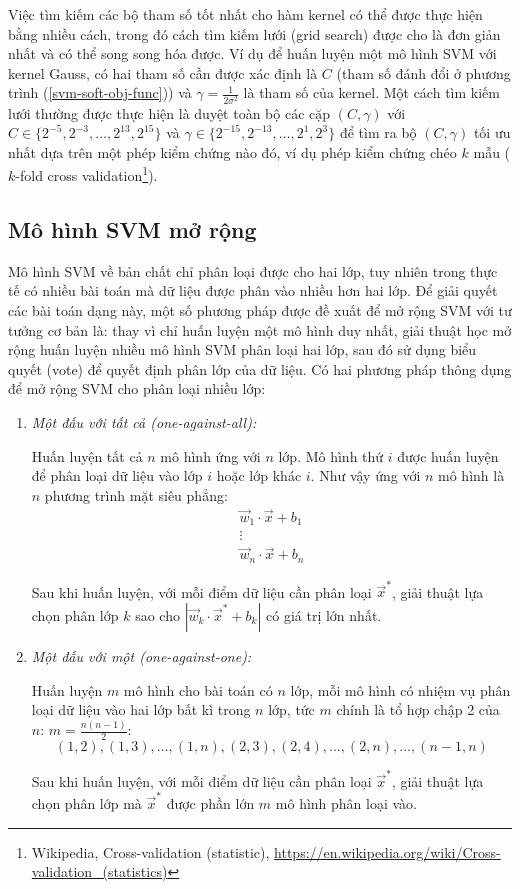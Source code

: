 Việc tìm kiếm các bộ tham số tốt nhất cho hàm kernel có thể được thực hiện bằng nhiều cách, trong đó cách tìm kiếm lưới (grid search) được cho là đơn giản nhất và có thể song song hóa được. Ví dụ để huấn luyện một mô hình SVM với kernel Gauss, có hai tham số cần được xác định là $C$ (tham số đánh đổi ở phương trình (\ref{svm-soft-obj-func})) và $\gamma=\frac{1}{2\sigma^2}$ là tham số của kernel. Một cách tìm kiếm lưới thường được thực hiện là duyệt toàn bộ các cặp $(C,\gamma)$ với $C\in\{2^{-5},2^{-3},\dots,2^{13},2^{15}\}$ và $\gamma\in\{2^{-15},2^{-13},\dots,2^1,2^3\}$ để tìm ra bộ $(C,\gamma)$ tối ưu nhất dựa trên một phép kiểm chứng nào đó, ví dụ phép kiểm chứng chéo $k$ mẫu ($k$-fold cross validation\footnote{Wikipedia, Cross-validation (statistic), \url{https://en.wikipedia.org/wiki/Cross-validation_(statistics)}}).

\subsection*{Mô hình SVM mở rộng}
Mô hình SVM về bản chất chỉ phân loại được cho hai lớp, tuy nhiên trong thực tế có nhiều bài toán mà dữ liệu được phân vào nhiều hơn hai lớp. Để giải quyết các bài toán dạng này, một số phương pháp được đề xuất để mở rộng SVM với tư tưởng cơ bản là: thay vì chỉ huấn luyện một mô hình duy nhất, giải thuật học mở rộng huấn luyện nhiều mô hình SVM phân loại hai lớp, sau đó sử dụng biểu quyết (vote) để quyết định phân lớp của dữ liệu. Có hai phương pháp thông dụng để mở rộng SVM cho phân loại nhiều lớp:
\begin{enumerate}
\item \emph{Một đấu với tất cả (one-against-all):}

Huấn luyện tất cả $n$ mô hình ứng với $n$ lớp. Mô hình thứ $i$ được huấn luyện để phân loại dữ liệu vào lớp $i$ hoặc lớp khác $i$. Như vậy ứng với $n$ mô hình là $n$ phương trình mặt siêu phẳng:
\[
\begin{matrix}
\vec{w}_1\cdot\vec{x}+b_1\\
\vdots\\
\vec{w}_n\cdot\vec{x}+b_n
\end{matrix}
\]

Sau khi huấn luyện, với mỗi điểm dữ liệu cần phân loại $\vec{x}^*$, giải thuật lựa chọn phân lớp $k$ sao cho $|\vec{w}_k\cdot\vec{x}^*+b_k|$ có giá trị lớn nhất.
\item \emph{Một đấu với một (one-against-one):}

Huấn luyện $m$ mô hình cho bài toán có $n$ lớp, mỗi mô hình có nhiệm vụ phân loại dữ liệu vào hai lớp bất kì trong $n$ lớp, tức $m$ chính là tổ hợp chập 2 của $n$: $m=\frac{n(n-1)}{2}$:\[(1,2),(1,3),\dots,(1,n),(2,3),(2,4),\dots,(2,n),\dots,(n-1,n)\]

Sau khi huấn luyện, với mỗi điểm dữ liệu cần phân loại $\vec{x}^*$, giải thuật lựa chọn phân lớp mà $\vec{x}^*$ được phần lớn $m$ mô hình phân loại vào.
\end{enumerate}

